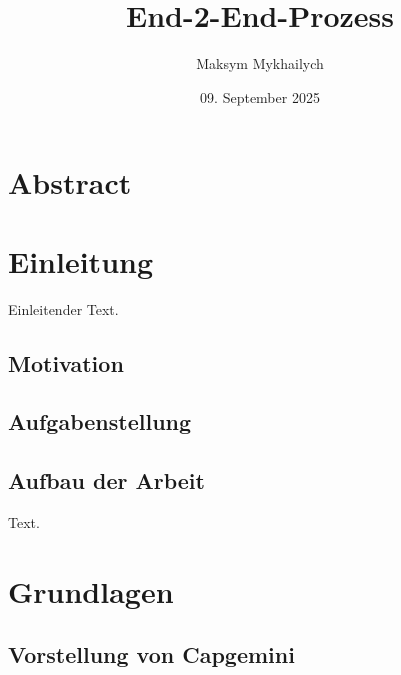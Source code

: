 \documentclass[a4paper, 12pt]{scrartcl}
\title{End-2-End-Prozess}
\author{Maksym Mykhailych}
\date{09. September 2025}
\begin{document}
	\maketitle
	\newpage
	\section*{Abstract}
	\newpage 	
	\tableofcontents
	\newpage
	
	\newpage
	\section{Einleitung}
	Einleitender Text.
	\newpage
	\subsection{Motivation}
	\subsection{Aufgabenstellung}
	\subsection{Aufbau der Arbeit}
	Text.
	\newpage
	\section{Grundlagen}
	\subsection{Vorstellung von Capgemini}
\end{document}
